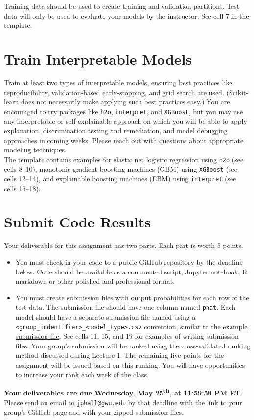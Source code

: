 \documentclass[fleqn]{article}
\begin{document}
\noindent Training data should be used to create training and validation partitions. Test data will only be used to evaluate your models by the instructor. See cell 7 in the template.

\section{Train Interpretable Models}

Train at least two types of interpretable models, ensuring best practices like reproducibility, validation-based early-stopping, and grid search are used. (Scikit-learn does not necessarily make applying such best practices easy.) You are encouraged to try packages like \href{https://docs.h2o.ai/h2o/latest-stable/h2o-docs/downloading.html}{\texttt{h2o}}, \href{https://github.com/interpretml/interpret}{\texttt{interpret}}, and \href{https://xgboost.readthedocs.io/en/latest/install.html}{\texttt{XGBoost}}, but you may use any interpretable or self-explainable approach on which you will be able to apply explanation, discrimination testing and remediation, and model debugging approaches in coming weeks. Please reach out with questions about appropriate modeling techniques.\\

\noindent The template contains examples for elastic net logistic regression using \texttt{h2o} (see cells 8--10), monotonic gradient boosting machines (GBM) using \texttt{XGBoost} (see cells 12--14), and explainable boosting machines (EBM) using \texttt{interpret} (see cells 16--18). 

\section{Submit Code Results}

Your deliverable for this assignment has two parts. Each part is worth 5 points. 

\begin{itemize}
	\item You must check in your code to a public GitHub repository by the deadline below. Code should be available as a commented script, Jupyter notebook, R markdown or other polished and professional format. 
	\item You must create submission files with output probabilities for each row of the test data. The submission file should have one column named \texttt{phat}. Each model should have a separate submission file named using a \texttt{<group\_indentifier>\_<model\_type>.csv} convention, similar to the \href{https://github.com/jphall663/GWU_rml/blob/master/assignments/assignment_1/ph_best_glm.csv}{example submission file}. See cells 11, 15, and 19 for examples of writing submission files. Your group's submission will be ranked using the cross-validated ranking method discussed during Lecture 1. The remaining five points for the assignment will be issued based on this ranking. You will have opportunities to increase your rank each week of the class. 
\end{itemize}

\noindent \textbf{Your deliverables are due Wednesday, May 25\textsuperscript{th}, at 11:59:59 PM ET.}\\

\noindent Please send an email to \href{mailto:jphall@gwu.edu}{\texttt{jphall@gwu.edu}} by that deadline with the link to your group's GitHub page and with your zipped submission files. 
\end{document}
